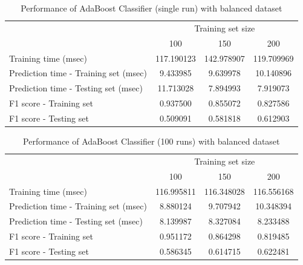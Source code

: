 \documentclass{article}
\begin{document}
	\begin{table}[h]
		\centering
		\begin{tabular}{l|ccc}
			\toprule
			{} & \multicolumn{3}{c}{Training set size} \\
			{} &         100 &         150 &         200 \\
			\midrule
			Training time (msec)                  &  117.190123 &  142.978907 &  119.709969 \\
			Prediction time - Training set (msec) &    9.433985 &    9.639978 &   10.140896 \\
			Prediction time - Testing set (msec)  &   11.713028 &    7.894993 &    7.919073 \\
			F1 score - Training set               &    0.937500 &    0.855072 &    0.827586 \\
			F1 score - Testing set                &    0.509091 &    0.581818 &    0.612903 \\
			\bottomrule
		\end{tabular}
		\caption{Performance of AdaBoost Classifier (single run) with balanced dataset}
		\label{tab:adaboost_weak_balanced_1}
	\end{table}
	
	\begin{table}[!ht]
		\centering
		\begin{tabular}{l|ccc}
			\toprule
			{} & \multicolumn{3}{c}{Training set size} \\
			{} &         100 &         150 &         200 \\
			\midrule
			Training time (msec)                  &  116.995811 &  116.348028 &  116.556168 \\
			Prediction time - Training set (msec) &    8.880124 &    9.707942 &   10.348394 \\
			Prediction time - Testing set (msec)  &    8.139987 &    8.327084 &    8.233488 \\
			F1 score - Training set               &    0.951172 &    0.864298 &    0.819485 \\
			F1 score - Testing set                &    0.586345 &    0.614715 &    0.622481 \\
			\bottomrule
		\end{tabular}
		\caption{Performance of AdaBoost Classifier (100 runs) with balanced dataset}
		\label{tab:adaboost_weak_balanced_100}
	\end{table}
	
\end{document}
